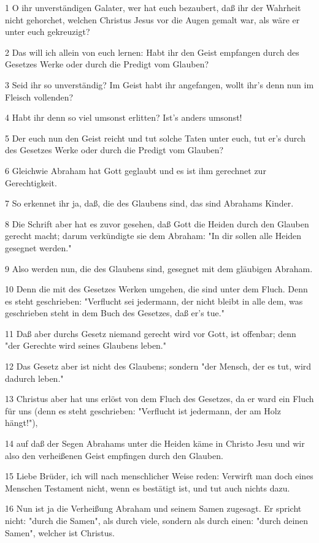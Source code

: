 \par 1 O ihr unverständigen Galater, wer hat euch bezaubert, daß ihr der Wahrheit nicht gehorchet, welchen Christus Jesus vor die Augen gemalt war, als wäre er unter euch gekreuzigt?
\par 2 Das will ich allein von euch lernen: Habt ihr den Geist empfangen durch des Gesetzes Werke oder durch die Predigt vom Glauben?
\par 3 Seid ihr so unverständig? Im Geist habt ihr angefangen, wollt ihr's denn nun im Fleisch vollenden?
\par 4 Habt ihr denn so viel umsonst erlitten? Ist's anders umsonst!
\par 5 Der euch nun den Geist reicht und tut solche Taten unter euch, tut er's durch des Gesetzes Werke oder durch die Predigt vom Glauben?
\par 6 Gleichwie Abraham hat Gott geglaubt und es ist ihm gerechnet zur Gerechtigkeit.
\par 7 So erkennet ihr ja, daß, die des Glaubens sind, das sind Abrahams Kinder.
\par 8 Die Schrift aber hat es zuvor gesehen, daß Gott die Heiden durch den Glauben gerecht macht; darum verkündigte sie dem Abraham: "In dir sollen alle Heiden gesegnet werden."
\par 9 Also werden nun, die des Glaubens sind, gesegnet mit dem gläubigen Abraham.
\par 10 Denn die mit des Gesetzes Werken umgehen, die sind unter dem Fluch. Denn es steht geschrieben: "Verflucht sei jedermann, der nicht bleibt in alle dem, was geschrieben steht in dem Buch des Gesetzes, daß er's tue."
\par 11 Daß aber durchs Gesetz niemand gerecht wird vor Gott, ist offenbar; denn "der Gerechte wird seines Glaubens leben."
\par 12 Das Gesetz aber ist nicht des Glaubens; sondern "der Mensch, der es tut, wird dadurch leben."
\par 13 Christus aber hat uns erlöst von dem Fluch des Gesetzes, da er ward ein Fluch für uns (denn es steht geschrieben: "Verflucht ist jedermann, der am Holz hängt!"),
\par 14 auf daß der Segen Abrahams unter die Heiden käme in Christo Jesu und wir also den verheißenen Geist empfingen durch den Glauben.
\par 15 Liebe Brüder, ich will nach menschlicher Weise reden: Verwirft man doch eines Menschen Testament nicht, wenn es bestätigt ist, und tut auch nichts dazu.
\par 16 Nun ist ja die Verheißung Abraham und seinem Samen zugesagt. Er spricht nicht: "durch die Samen", als durch viele, sondern als durch einen: "durch deinen Samen", welcher ist Christus.
